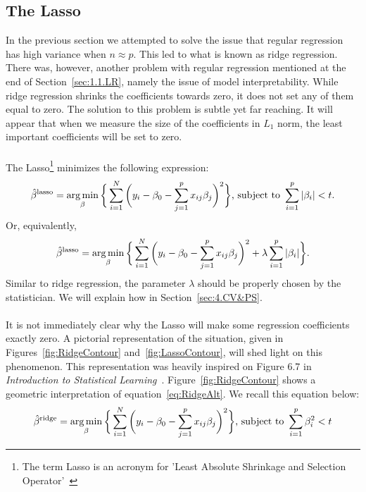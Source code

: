 \subsection{The Lasso} \label{sec:Lasso}
In the previous section we attempted to solve the issue that regular regression has high variance when $n \approx p$. This led to what is known as ridge regression. There was, however, another problem with regular regression mentioned at the end of Section~\ref{sec:1.1.LR}, namely the issue of model interpretability. While ridge regression shrinks the coefficients towards zero, it does not set any of them equal to zero. The solution to this problem is subtle yet far reaching. It will appear that when we measure the size of the coefficients in $L_1$ norm, the least important coefficients will be set to zero.\\
\\
The Lasso\footnote{The term Lasso is an acronym for 'Least Absolute Shrinkage and Selection Operator'~\cite{Kas2018}} minimizes the following expression:
\begin{equation} \label{eq:Lasso}
    \begin{aligned}
        \hat{\beta}{}^{\text{lasso}} = \argmin_{\beta}\bigg\{\sum_{i=1}^N \bigg(y_i - \beta_0 - \sum_{j=1}^p x_{ij}\beta_j\bigg)^2\bigg\} \newline \text{, subject to } \sum_{i=1}^p |\beta_i| < t.
    \end{aligned}
\end{equation}
Or, equivalently,
\begin{equation}\label{eq:LassoAlt}
    \hat{\beta}{}^{\textrm{lasso}} = \operatorname*{arg\,min}_{\beta}\bigg\{\sum_{i=1}^N \bigg(y_i - \beta_0 - \sum_{j=1}^p x_{ij}\beta_j\bigg)^2 + \lambda \sum_{i=1}^p |\beta_i|\bigg\}.
\end{equation}
Similar to ridge regression, the parameter $\lambda$ should be properly chosen by the statistician. We will explain how in Section~\ref{sec:4.CV&PS}.\\
\\
It is not immediately clear why the Lasso will make some regression coefficients exactly zero. A pictorial representation of the situation, given in Figures~\ref{fig:RidgeContour} and~\ref{fig:LassoContour}, will shed light on this phenomenon. This representation was heavily inspired on Figure 6.7 in \textit{Introduction to Statistical Learning}~\cite{ISL2013}. Figure~\ref{fig:RidgeContour} shows a geometric interpretation of equation~\eqref{eq:RidgeAlt}. We recall this equation below:
\begin{equation*}
    \begin{aligned}
        \hat{\beta}{}^{\text{ridge}} = \argmin_{\beta}\bigg\{\sum_{i=1}^N \bigg(y_i - \beta_0 - \sum_{j=1}^p x_{ij}\beta_j\bigg)^2\bigg\} \newline \text{, subject to } \sum_{i=1}^p \beta_i^2 < t
    \end{aligned}
\end{equation*}
